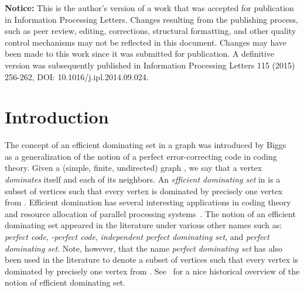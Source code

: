 \documentclass[]{elsarticle}
\begin{document}
\noindent
\textbf{Notice:} This is the author's version of a work that was accepted for publication in Information Processing Letters. Changes resulting from the publishing process, such as peer review, editing, corrections, structural formatting, and other quality control mechanisms may not be reflected in this document. Changes may have been made to this work since it was submitted for publication. A definitive version was subsequently published in Information Processing Letters 115 (2015) 256-262, DOI: 10.1016/j.ipl.2014.09.024.

\section{Introduction}

The concept of an efficient dominating set in a graph was introduced by Biggs~\cite{Biggs} as a generalization of the notion of a perfect error-correcting code in coding theory. Given a (simple, finite, undirected) graph , we say that a vertex \emph{dominates} itself and each of its neighbors. 
An \emph{efficient dominating set} in  is a subset of vertices  such that every vertex  is dominated by precisely one vertex from . 
Efficient domination has several interesting applications in coding theory and resource allocation of parallel processing systems~\cite{Biggs, LLT97, LS90}. The notion of an efficient dominating set appeared in the literature under various other names such as: \emph{perfect code}, \emph{-perfect code}, \emph{independent perfect dominating set}, and \emph{perfect dominating set}. 
Note, however, that the name \emph{perfect dominating set} has also been used in the literature to denote a subset of vertices  such that every vertex  is dominated by precisely one vertex from . 
See~\cite{LT02} for a nice historical overview of the notion of efficient dominating set.
\end{document}
